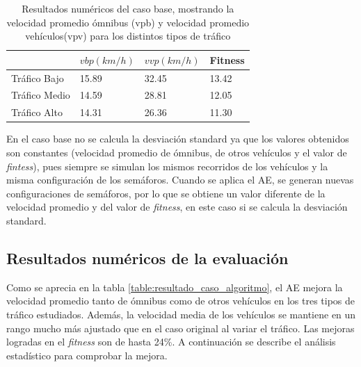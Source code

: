  \begin{table}[H]
 	\renewcommand{\arraystretch}{1.2}
 	\caption[Resultados numéricos del caso base.]{Resultados numéricos del caso base, mostrando la velocidad promedio ómnibus (vpb) y velocidad promedio vehículos(vpv) para los distintos tipos de tráfico}
 	\label{table:resultado_caso_base}
 	\centering
 	\begin{tabular}{p{2.5cm}p{2.5cm}p{2.5cm}p{2cm} }
 		\hline
 		&
 		$vbp(km/h)$& 
 		$vvp(km/h)$ & 
 		Fitness \\ 
 		\hline
 		Tráfico Bajo & 15.89  & 32.45& 13.42\\
 		Tráfico Medio & 14.59  & 28.81& 12.05\\
 		Tráfico Alto & 14.31  & 26.36& 11.30\\

 		\hline
 	\end{tabular}
 \end{table}
 
 En el caso base no se calcula la desviación standard ya que los valores obtenidos son constantes (velocidad promedio de ómnibus, de otros vehículos y el valor de \emph{fintess}), pues siempre se simulan los mismos recorridos de los vehículos y la misma configuración de los semáforos. Cuando se aplica el AE, se generan nuevas configuraciones de semáforos, por lo que se obtiene un valor diferente de la velocidad promedio y del valor de \emph{fitness}, en este caso si se calcula la desviación standard.


\subsection{Resultados numéricos de la evaluación }

Como se aprecia en la tabla \ref{table:resultado_caso_algoritmo}, el AE mejora la velocidad promedio tanto de ómnibus como de otros vehículos en los tres tipos de tráfico estudiados. Además, la velocidad media de los vehículos se mantiene en un rango mucho más ajustado que en el caso original al variar el tráfico. Las mejoras logradas en el \emph{fitness} son de hasta 24\%. A continuación se describe el análisis estadístico para comprobar la mejora.


